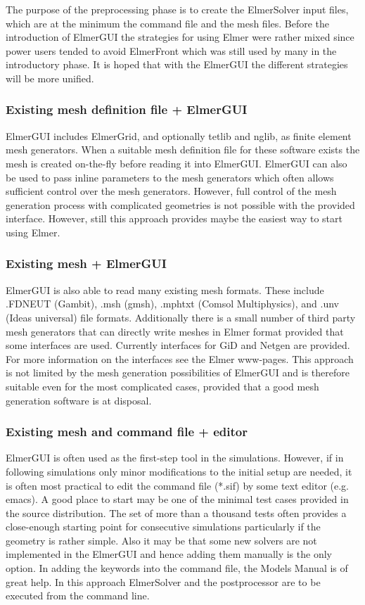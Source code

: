 The purpose of the preprocessing phase is to create the ElmerSolver input files, which 
are at the minimum the command file and the mesh files. Before the introduction of ElmerGUI
the strategies for using Elmer were rather mixed since power users tended to avoid ElmerFront
which was still used by many in the introductory phase. It is hoped that with the ElmerGUI
the different strategies will be more unified. 


\subsubsection*{Existing mesh definition file + ElmerGUI}

ElmerGUI includes 
ElmerGrid, and optionally tetlib and nglib,
as finite element mesh generators.
When a suitable mesh definition file for these software exists the mesh is created on-the-fly
before reading it into ElmerGUI. ElmerGUI can also be used to pass inline parameters to the mesh
generators which often allows sufficient control over the mesh generators. However, full control 
of the mesh generation process with complicated geometries is not possible with the provided interface.
However, still this approach provides maybe the easiest way to start using Elmer. 


\subsubsection*{Existing mesh + ElmerGUI}

ElmerGUI is also able to read many existing mesh formats. These include .FDNEUT (Gambit), 
.msh (gmsh), .mphtxt (Comsol Multiphysics), and .unv (Ideas universal) file formats. 
Additionally there is a small number of third party mesh generators that can directly write meshes in Elmer format
provided that some interfaces are used. Currently interfaces for GiD and Netgen are provided. 
For more information on the interfaces see the Elmer www-pages. 
This approach is not limited by the mesh generation possibilities of ElmerGUI and is therefore suitable 
even for the most complicated cases, provided that a good mesh generation software is at disposal.


\subsubsection*{Existing mesh and command file + editor}

ElmerGUI is often used as the first-step tool in the simulations. However, if in following simulations only minor
modifications to the initial setup are needed, it is often most practical to edit the command file 
(*.sif) by some text editor (e.g. emacs). A good place to start may be one of the minimal test cases 
provided in the source distribution. The set of more than a thousand tests often provides a close-enough starting point
for consecutive simulations particularly if the geometry is rather simple.
Also it may be that some new solvers are not implemented in the 
ElmerGUI and hence adding them manually is the only option. 
In adding the keywords into the
command file, the Models Manual is of great help. In this approach ElmerSolver and the postprocessor 
are to be executed from the command line. 


